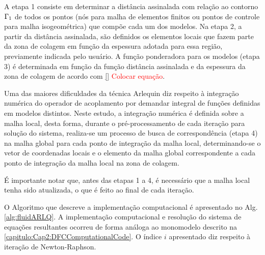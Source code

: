 A etapa 1 consiste em determinar a distância assinalada com relação ao contorno $\Gamma_1$ de todos os pontos (nós para malha de elementos finitos ou pontos de controle para malha isogeométrica) que compõe cada um dos modelos. Na etapa 2, a partir da distância assinalada, são definidos os elementos locais que fazem parte da zona de colagem em função da espessura adotada para essa região, previamente indicada pelo usuário. A função ponderadora para os modelos (etapa 3) é  determinada em função da função distância assinalada e da espessura da zona de colagem de acordo com \autoref{} \textcolor{red}{Colocar equação}. 

Uma das maiores dificuldades da técnica Arlequin diz respeito à integração numérica do operador de acoplamento por demandar integral de funções definidas em modelos distintos. Neste estudo, a integração numérica é definida sobre a malha local, desta forma, durante o pré-processamento de cada iteração para solução do sistema, realiza-se um processo de busca de correspondência (etapa 4) na malha global para cada ponto de integração da malha local, determinando-se o vetor de coordenadas locais e o elemento da malha global correspondente a cada ponto de integração da malha local na zona de colagem.

É importante notar que, antes das etapas 1 a 4, é necessário que a malha local tenha sido atualizada, o que é feito ao final de cada iteração.

O Algoritmo que descreve a implementação computacional é apresentado no Alg. \ref{alg:fluidARLQ}. A implementação computacional e resolução do sistema de equações resultantes ocorreu de forma análoga ao monomodelo descrito na \autoref{capitulo:Cap2:DFCComputationalCode}. O índice $i$ apresentado diz respeito à iteração de Newton-Raphson.

